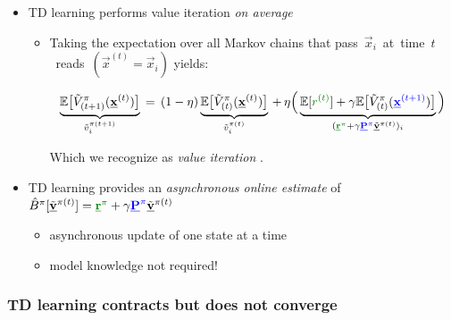 \begin{frame}\frametitle{\subsubsecname}

\begin{itemize}
	\item TD learning performs value iteration \emph{on average}
		\vspace{1mm}
		
		\begin{itemize}
			\item Taking the expectation over all Markov chains 
			that pass~$\vec x_i$~at~time~$t$~reads~$(\vec x^{(t)} = \vec x_i)$ yields:
			
			\begin{equation}
		\underbrace{\E\big\lbrack\tilde V^\pi_{(t+1)}(\vec x^{(t)})\big\rbrack
			}_{\tilde v_i^{\pi(t+1)}}
		\,=\, 
		(1 - \lr)\underbrace{\E\big\lbrack \tilde V^\pi_{(t)}(\vec x^{(t)}) \big\rbrack
			}_{\tilde v_i^{\pi(t)}}
		\,+\, \lr \Big( \underbrace{\E\lbrack{\color{reward} r^{(t)}}\rbrack
		+ \gamma \E\big\lbrack\tilde V^\pi_{(t)}({\color{trans}\vec x^{(t+1)}})\big\rbrack
		}_{({\color{reward} \vec r^\pi} 
			+ \gamma {\color{trans} \vec P^\pi} \tilde{\vec v}^{\pi(t)})_i}\Big)
			\end{equation}
			
		Which we recognize as \emph{value iteration} .
			
		\end{itemize}
	
	
	\vspace{2mm}
	\item TD learning provides an {\em asynchronous online estimate} of 
			$\hat B^\pi[\tilde{\vec v}^{\pi(t)}] = {\color{reward}\vec r^\pi} 
			+ \gamma {\color{trans}\vec P^\pi} \tilde{\vec v}^{\pi(t)}$
		\vspace{1mm}
		\begin{itemize}
			\item asynchronous update of one state at a time
					\vspace{1mm}
			\item model knowledge not required!
		\end{itemize}

	\end{itemize}

\end{frame}

\newpage

\subsubsection{TD learning contracts but does not converge}

